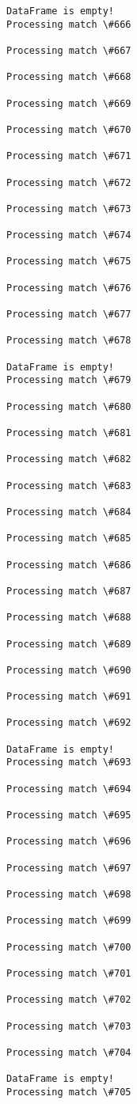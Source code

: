 \documentclass[11pt]{article}
\begin{document}
\begin{Verbatim}[commandchars=\\\{\}]
DataFrame is empty!
Processing match \#666

Processing match \#667

Processing match \#668

Processing match \#669

Processing match \#670

Processing match \#671

Processing match \#672

Processing match \#673

Processing match \#674

Processing match \#675

Processing match \#676

Processing match \#677

Processing match \#678

DataFrame is empty!
Processing match \#679

Processing match \#680

Processing match \#681

Processing match \#682

Processing match \#683

Processing match \#684

Processing match \#685

Processing match \#686

Processing match \#687

Processing match \#688

Processing match \#689

Processing match \#690

Processing match \#691

Processing match \#692

DataFrame is empty!
Processing match \#693

Processing match \#694

Processing match \#695

Processing match \#696

Processing match \#697

Processing match \#698

Processing match \#699

Processing match \#700

Processing match \#701

Processing match \#702

Processing match \#703

Processing match \#704

DataFrame is empty!
Processing match \#705


\end{Verbatim}
\end{document}
